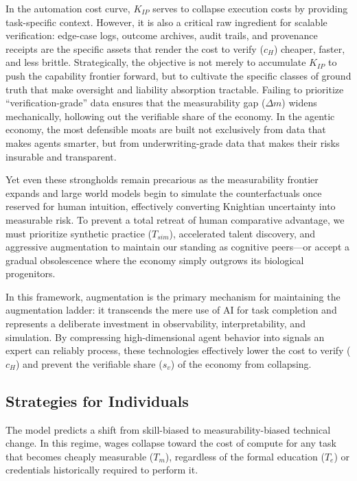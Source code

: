 \documentclass[12pt, letter]{article}
\begin{document}
In the automation cost curve, $K_{IP}$ serves to collapse execution costs by providing task-specific context. However, it is also a critical raw ingredient for scalable verification: edge-case logs, outcome archives, audit trails, and provenance receipts are the specific assets that render the cost to verify ($c_H$) cheaper, faster, and less brittle. Strategically, the objective is not merely to accumulate $K_{IP}$ to push the capability frontier forward, but to cultivate the specific classes of ground truth that make oversight and liability absorption tractable. Failing to prioritize ``verification-grade'' data ensures that the measurability gap ($\Delta m$) widens mechanically, hollowing out the verifiable share of the economy. In the agentic economy, the most defensible moats are built not exclusively from data that makes agents smarter, but from underwriting-grade data that makes their risks insurable and transparent.

Yet even these strongholds remain precarious as the measurability frontier expands and large world models begin to simulate the counterfactuals once reserved for human intuition, effectively converting Knightian uncertainty into measurable risk. To prevent a total retreat of human comparative advantage, we must prioritize synthetic practice ($T_{sim}$), accelerated talent discovery, and aggressive augmentation to maintain our standing as cognitive peers—or accept a gradual obsolescence where the economy simply outgrows its biological progenitors. 

In this framework, augmentation is the primary mechanism for maintaining the augmentation ladder: it transcends the mere use of AI for task completion and represents a deliberate investment in observability, interpretability, and simulation. By compressing high-dimensional agent behavior into signals an expert can reliably process, these technologies effectively lower the cost to verify ($c_H$) and prevent the verifiable share ($s_v$) of the economy from collapsing.

\subsection{Strategies for Individuals}\label{sec:strategies_individuals}

The model predicts a shift from skill-biased to measurability-biased technical change. In this regime, wages collapse toward the cost of compute for any task that becomes cheaply measurable ($T_m$), regardless of the formal education ($T_e$) or credentials historically required to perform it. 
\end{document}
